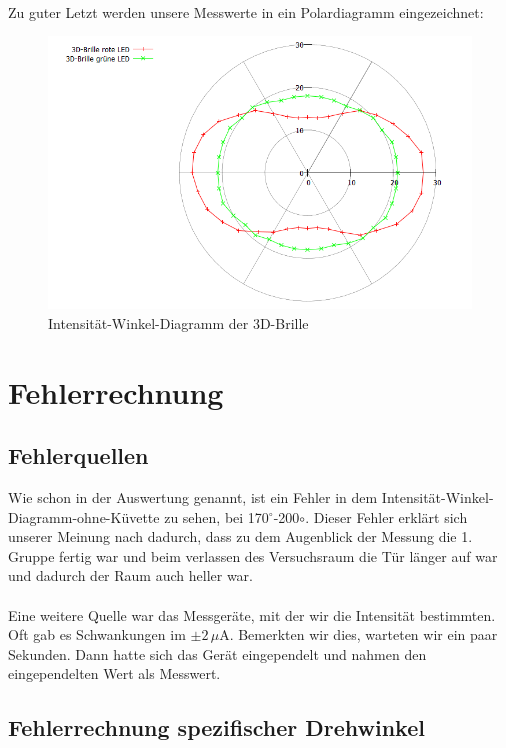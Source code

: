 \documentclass[fontsize=12pt]{scrartcl}
\begin{document}
~\\
Zu guter Letzt werden unsere Messwerte in ein Polardiagramm eingezeichnet:
\begin{figure}[H]
\vspace{-17pt}
        \includegraphics[scale=0.75]{Graphik/3D}
        \vspace{-10pt}
		\caption{Intensität-Winkel-Diagramm der 3D-Brille}
\end{figure}
\noindent
\newpage
\section{Fehlerrechnung}

\subsection{Fehlerquellen}

Wie schon in der Auswertung genannt, ist ein Fehler in dem Intensität-Winkel-Diagramm-ohne-Küvette zu sehen, bei 170$^\circ$-200$\circ$.
Dieser Fehler erklärt sich unserer Meinung nach dadurch, dass zu dem Augenblick der Messung die 1. Gruppe fertig war und beim verlassen des Versuchsraum die Tür länger auf war und dadurch  der Raum auch heller war. \\
~\\
Eine weitere Quelle war das Messgeräte, mit der wir die Intensität bestimmten. Oft gab es Schwankungen im $\pm 2\,\mu$A. Bemerkten wir dies, warteten wir ein paar Sekunden. Dann hatte sich das Gerät eingependelt und  nahmen den eingependelten Wert als Messwert. 

\subsection{Fehlerrechnung spezifischer Drehwinkel}
\end{document}
